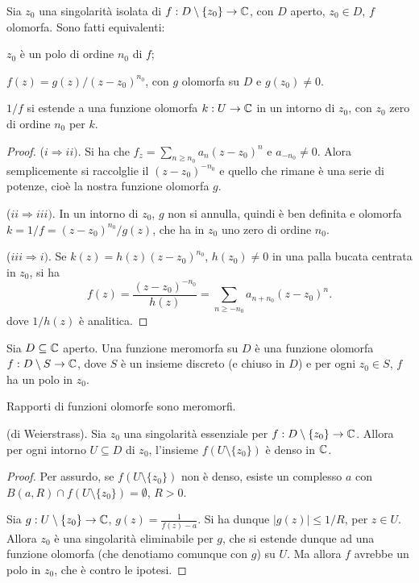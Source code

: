\begin{prop}
    Sia $z_0$ una singolarit\`a isolata di $f:D\setminus\{z_0\}\rightarrow\mathbb{C}$,
    con $D$ aperto, $z_0\in D$, $f$ olomorfa. Sono fatti equivalenti:
    \begin{nlist}
    \item
        $z_0$ \`e un polo di ordine $n_0$ di $f$;
    \item
        $f(z) = g(z)/(z-z_0)^{n_0}$, con $g$ olomorfa su $D$ e $g(z_0)\neq 0$.
    \item
        $1/f$ si estende a una funzione olomorfa $k:U\rightarrow\mathbb{C}$ in un
        intorno di $z_0$, con $z_0$ zero di ordine $n_0$ per $k$.
    \end{nlist}
\end{prop}
\begin{proof}
    ($i\Rightarrow ii)$. Si ha che $f_z = \sum_{n\geq n_0} a_n(z-z_0)^n$ e
    $a_{-n_0} \neq 0$. Alora semplicemente si raccolglie il $(z-z_0)^{-n_0}$ e
    quello che rimane \`e una serie di potenze, cio\`e la nostra funzione
    olomorfa $g$.

    ($ii\Rightarrow iii)$. In un intorno di $z_0$, $g$ non si annulla, quindi
    \`e ben definita e olomorfa $k=1/f = (z-z_0)^{n_0}/g(z)$, che ha in $z_0$
    uno zero di ordine $n_0$.

    ($iii\Rightarrow i)$. Se $k(z) = h(z)(z-z_0)^{n_0}$, $h(z_0)\neq 0$ in una
    palla bucata centrata in $z_0$, si ha
    \[
        f(z) = \frac{(z-z_0)^{-n_0}}{h(z)} = \sum_{n\geq -n_0}
        a_{n+n_0}(z-z_0)^n.
    \]
    dove $1/h(z)$ \`e analitica.
\end{proof}

\begin{defn}
    Sia $D\subseteq\mathbb{C}$ aperto. Una funzione meromorfa su $D$ \`e una funzione
    olomorfa $f:D\setminus S\rightarrow\mathbb{C}$, dove $S$ \`e un insieme discreto (e
    chiuso in $D$) e per ogni $z_0\in S$, $f$ ha un polo in $z_0$.
\end{defn}

\begin{exc}
    Rapporti di funzioni olomorfe sono meromorfi.
\end{exc}

\begin{thm}
    (di Weierstrass). Sia $z_0$ una singolarit\`a essenziale per
    $f:D\setminus\{z_0\}\rightarrow\mathbb{C}$. Allora per ogni intorno $U\subseteq D$
    di $z_0$, l'insieme $f(U\setminus\{z_0\})$ \`e denso in $\mathbb{C}$.
\end{thm}
\begin{proof}
    Per assurdo, se $f(U\setminus\{z_0\})$ non \`e denso, esiste un complesso
    $a$ con $B(a,R)\cap f(U\setminus\{z_0\})=\emptyset$, $R>0$.

    Sia $g:U\setminus\{z_0\}\rightarrow\mathbb{C}$, $g(z) = \frac{1}{f(z)-a}$. Si ha
    dunque $|g(z)| \leq 1/R$, per $z\in U$. Allora $z_0$ \`e una singolarit\`a
    eliminabile per $g$, che si estende dunque ad una funzione olomorfa (che
    denotiamo comunque con $g$) su $U$. Ma allora $f$ avrebbe un polo in $z_0$,
    che \`e contro le ipotesi.
\end{proof}

